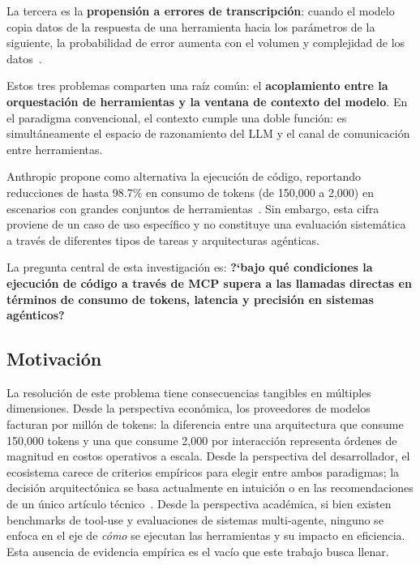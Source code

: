 \documentclass[runningheads]{llncs}
\begin{document}
La tercera es la \textbf{propensi\'on a errores de transcripci\'on}: cuando el
modelo copia datos de la respuesta de una herramienta hacia los par\'ametros de
la siguiente, la probabilidad de error aumenta con el volumen y complejidad de
los datos~\cite{ref_codeexec}.

Estos tres problemas comparten una ra\'iz com\'un: el \textbf{acoplamiento entre
la orquestaci\'on de herramientas y la ventana de contexto del modelo}. En el
paradigma convencional, el contexto cumple una doble funci\'on: es
simult\'aneamente el espacio de razonamiento del LLM y el canal de comunicaci\'on
entre herramientas.

Anthropic propone como alternativa la ejecuci\'on de c\'odigo, reportando
reducciones de hasta 98.7\% en consumo de tokens (de 150,000 a 2,000) en
escenarios con grandes conjuntos de herramientas~\cite{ref_codeexec}. Sin
embargo, esta cifra proviene de un caso de uso espec\'ifico y no constituye una
evaluaci\'on sistem\'atica a trav\'es de diferentes tipos de tareas y arquitecturas
ag\'enticas.

La pregunta central de esta investigaci\'on es: \textbf{?`bajo qu\'e condiciones la
ejecuci\'on de c\'odigo a trav\'es de MCP supera a las llamadas directas en
t\'erminos de consumo de tokens, latencia y precisi\'on en sistemas ag\'enticos?}

\subsection{Motivaci\'on}
\label{sec:motivation}

La resoluci\'on de este problema tiene consecuencias tangibles en m\'ultiples
dimensiones. Desde la perspectiva econ\'omica, los proveedores de modelos
facturan por mill\'on de tokens: la diferencia entre una arquitectura que consume
150,000 tokens y una que consume 2,000 por interacci\'on representa \'ordenes de
magnitud en costos operativos a escala. Desde la perspectiva del desarrollador,
el ecosistema carece de criterios emp\'iricos para elegir entre ambos paradigmas;
la decisi\'on arquitect\'onica se basa actualmente en intuici\'on o en las
recomendaciones de un \'unico art\'iculo t\'ecnico~\cite{ref_codeexec}. Desde la
perspectiva acad\'emica, si bien existen benchmarks de tool-use y evaluaciones de
sistemas multi-agente, ninguno se enfoca en el eje de \textit{c\'omo} se ejecutan
las herramientas y su impacto en eficiencia. Esta ausencia de evidencia emp\'irica
es el vac\'io que este trabajo busca llenar.
\end{document}
